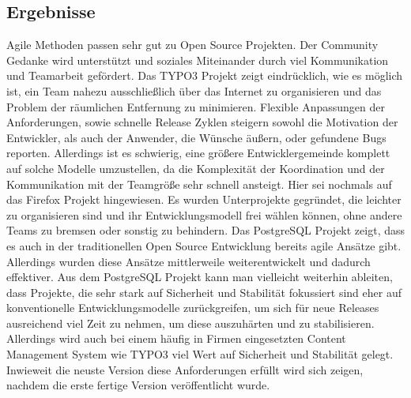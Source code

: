 \subsection{Ergebnisse}
Agile Methoden passen sehr gut zu Open Source Projekten. Der Community Gedanke wird unterstützt und soziales Miteinander durch viel Kommunikation und Teamarbeit gefördert. Das TYPO3 Projekt zeigt eindrücklich, wie es möglich ist, ein Team nahezu ausschließlich über das Internet zu organisieren und das Problem der räumlichen Entfernung zu minimieren. Flexible Anpassungen der Anforderungen, sowie schnelle Release Zyklen steigern sowohl die Motivation der Entwickler, als auch der Anwender, die Wünsche äußern, oder gefundene Bugs reporten. Allerdings ist es schwierig, eine größere Entwicklergemeinde komplett auf solche Modelle umzustellen, da die Komplexität der Koordination und der Kommunikation mit der Teamgröße sehr schnell ansteigt. Hier sei nochmals auf das Firefox Projekt hingewiesen. Es wurden Unterprojekte gegründet, die leichter zu organisieren sind und ihr Entwicklungsmodell frei wählen können, ohne andere Teams zu bremsen oder sonstig zu behindern. Das PostgreSQL Projekt zeigt, dass es auch in der traditionellen Open Source Entwicklung bereits agile Ansätze gibt. Allerdings wurden diese Ansätze mittlerweile weiterentwickelt und dadurch effektiver. Aus dem PostgreSQL Projekt kann man vielleicht weiterhin ableiten, dass Projekte, die sehr stark auf Sicherheit und Stabilität fokussiert sind eher auf konventionelle Entwicklungsmodelle zurückgreifen, um sich für neue Releases ausreichend viel Zeit zu nehmen, um diese auszuhärten und zu stabilisieren. Allerdings wird auch bei einem häufig in Firmen eingesetzten Content Management System wie TYPO3 viel Wert auf Sicherheit und Stabilität gelegt. Inwieweit die neuste Version diese Anforderungen erfüllt wird sich zeigen, nachdem die erste fertige Version veröffentlicht wurde.


